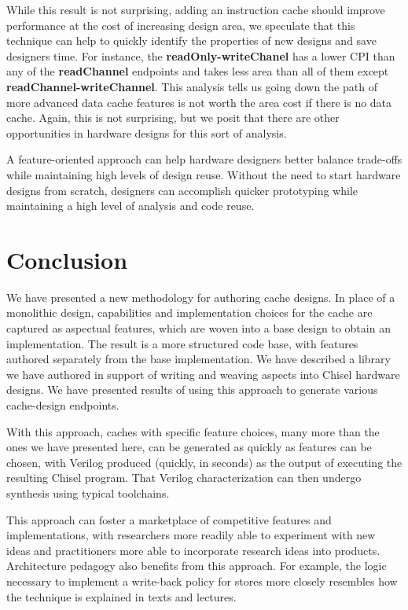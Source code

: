 \documentclass[conference]{IEEEtran}
\begin{document}
While this result is not surprising, adding an instruction cache should improve performance at the cost of increasing design area, we speculate that this technique can help to quickly identify the properties of new designs and save designers time. For instance, the \textbf{readOnly-writeChanel} has a lower CPI than any of the \textbf{readChannel} endpoints and takes less area than all of them except \textbf{readChannel-writeChannel}. This analysis tells us going down the path of more advanced data cache features is not worth the area cost if there is no data cache. Again, this is not surprising, but we posit that there are other opportunities in hardware designs for this sort of analysis.

A feature-oriented approach can help hardware designers better balance trade-offs while maintaining high levels of design reuse. Without the need to start hardware designs from scratch, designers can accomplish quicker prototyping while maintaining a high level of analysis and code reuse.

\section{Conclusion}
We have presented a new methodology for authoring cache designs.  In place of a monolithic design, capabilities and implementation choices for the cache are captured as aspectual features, which are woven into a base design to obtain an implementation.   The result is a more structured code base, with features authored separately from the base implementation.  We have described a library we have authored in support of writing and weaving aspects into Chisel hardware designs.  We have presented results of using this approach to generate various cache-design endpoints.

With this approach, caches with specific feature choices, many more than the ones we have presented here, can be generated as quickly as features can be chosen, with Verilog produced (quickly, in seconds) as the output of executing the resulting Chisel program.  That Verilog characterization can then undergo synthesis using typical toolchains.

This approach can foster a marketplace of competitive features and implementations, with researchers more readily able to experiment with new ideas and practitioners more able to incorporate research ideas into products.  Architecture pedagogy also benefits from this approach.  For example, the logic necessary to implement a write-back policy for stores more closely resembles how the technique is explained in texts and lectures.
\end{document}
